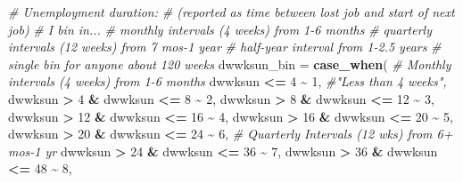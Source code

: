 \documentclass[
]{article}
\newenvironment{Shaded}{\begin{snugshade}}{\end{snugshade}}
\newcommand{\AttributeTok}[1]{\textcolor[rgb]{0.13,0.29,0.53}{#1}}
\newcommand{\CommentTok}[1]{\textcolor[rgb]{0.56,0.35,0.01}{\textit{#1}}}
\newcommand{\DecValTok}[1]{\textcolor[rgb]{0.00,0.00,0.81}{#1}}
\newcommand{\FunctionTok}[1]{\textcolor[rgb]{0.13,0.29,0.53}{\textbf{#1}}}
\newcommand{\NormalTok}[1]{#1}
\newcommand{\SpecialCharTok}[1]{\textcolor[rgb]{0.81,0.36,0.00}{\textbf{#1}}}
\begin{document}
\begin{Shaded}
\begin{Highlighting}[]
         \CommentTok{\# Unemployment duration:}
                  \CommentTok{\# (reported as time between lost job and start of next job)}
         \CommentTok{\# I bin in...}
           \CommentTok{\# monthly intervals (4 weeks) from 1{-}6 months}
           \CommentTok{\# quarterly intervals (12 weeks) from 7 mos{-}1 year}
           \CommentTok{\# half{-}year interval from 1{-}2.5 years}
           \CommentTok{\# single bin for anyone about 120 weeks}
         \AttributeTok{dwwksun\_bin =} \FunctionTok{case\_when}\NormalTok{(}
           \CommentTok{\# Monthly intervals (4 weeks) from 1{-}6 months}
\NormalTok{           dwwksun }\SpecialCharTok{\textless{}=} \DecValTok{4} \SpecialCharTok{\textasciitilde{}} \DecValTok{1}\NormalTok{, }\CommentTok{\#"Less than 4 weeks",}
\NormalTok{                                 dwwksun }\SpecialCharTok{\textgreater{}} \DecValTok{4} \SpecialCharTok{\&}\NormalTok{ dwwksun }\SpecialCharTok{\textless{}=} \DecValTok{8} \SpecialCharTok{\textasciitilde{}} \DecValTok{2}\NormalTok{,}
\NormalTok{                                 dwwksun }\SpecialCharTok{\textgreater{}} \DecValTok{8} \SpecialCharTok{\&}\NormalTok{ dwwksun }\SpecialCharTok{\textless{}=} \DecValTok{12} \SpecialCharTok{\textasciitilde{}} \DecValTok{3}\NormalTok{,}
\NormalTok{                                 dwwksun }\SpecialCharTok{\textgreater{}} \DecValTok{12} \SpecialCharTok{\&}\NormalTok{ dwwksun }\SpecialCharTok{\textless{}=} \DecValTok{16} \SpecialCharTok{\textasciitilde{}} \DecValTok{4}\NormalTok{, }
\NormalTok{                                 dwwksun }\SpecialCharTok{\textgreater{}} \DecValTok{16} \SpecialCharTok{\&}\NormalTok{ dwwksun }\SpecialCharTok{\textless{}=} \DecValTok{20} \SpecialCharTok{\textasciitilde{}} \DecValTok{5}\NormalTok{,}
\NormalTok{                                 dwwksun }\SpecialCharTok{\textgreater{}} \DecValTok{20} \SpecialCharTok{\&}\NormalTok{ dwwksun }\SpecialCharTok{\textless{}=} \DecValTok{24} \SpecialCharTok{\textasciitilde{}} \DecValTok{6}\NormalTok{,}
                                 \CommentTok{\# Quarterly Intervals (12 wks) from 6+ mos{-}1 yr}
\NormalTok{                                 dwwksun }\SpecialCharTok{\textgreater{}} \DecValTok{24} \SpecialCharTok{\&}\NormalTok{ dwwksun }\SpecialCharTok{\textless{}=} \DecValTok{36} \SpecialCharTok{\textasciitilde{}} \DecValTok{7}\NormalTok{,}
\NormalTok{                                 dwwksun }\SpecialCharTok{\textgreater{}} \DecValTok{36} \SpecialCharTok{\&}\NormalTok{ dwwksun }\SpecialCharTok{\textless{}=} \DecValTok{48} \SpecialCharTok{\textasciitilde{}} \DecValTok{8}\NormalTok{, }

\end{Highlighting}
\end{Shaded}
\end{document}
